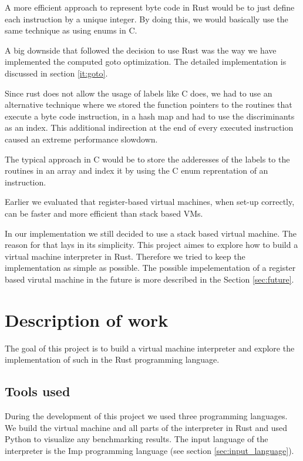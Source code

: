 \documentclass{article}
\begin{document}
A more efficient approach to represent byte code in Rust would be to just
define each instruction by a unique integer. By doing this, we would basically
use the same technique as using enums in C.
 
A big downside that followed the decision to use Rust was the way we have
implemented the computed goto optimization. The detailed implementation is
discussed in section \ref{it:goto}.

Since rust does not allow the usage of labels like C does, we had to use an
alternative technique where we stored the function pointers to the routines
that execute a byte code instruction, in a hash map and had to use the
discriminants as an index. This additional indirection at the end of every 
executed instruction caused an extreme performance slowdown.

The typical approach in C would be to store the adderesses of the labels to the
routines in an array and index it by using the C enum reprentation of an
instruction.

Earlier we evaluated that register-based virtual machines, when set-up
correctly, can be faster and more efficient than stack based VMs.

In our implementation we still decided to use a stack based virtual machine.
The reason for that lays in its simplicity. This project aimes to explore
how to build a virtual machine interpreter in Rust. Therefore we tried to
keep the implementation as simple as possible. The possible impelementation of
a register based virutal machine in the future is more described in the Section
\ref{sec:future}.

      

\section{Description of work}
The goal of this project is to build a virtual machine interpreter and 
explore the implementation of such in the Rust programming language.

\subsection{Tools used}
During the development of this project we used three programming languages. We
build the virtual machine and all parts of the interpreter in Rust and used
Python to visualize any benchmarking results. The input language of the
interpreter is the Imp programming language (see section
\ref{sec:input_language}). ~\cite{Pierce:SF1}
\end{document}
